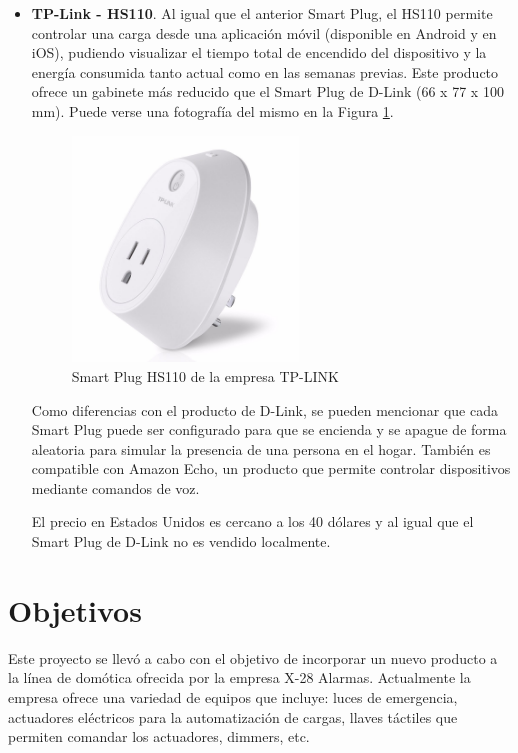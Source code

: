 \begin{itemize}
\item \textbf{TP-Link - HS110}. Al igual que el anterior Smart Plug, el HS110 permite controlar una carga desde una aplicación móvil (disponible en Android y en iOS), pudiendo visualizar el tiempo total de encendido del dispositivo y la energía consumida tanto actual como en las semanas previas. Este producto ofrece un gabinete más reducido que el Smart Plug de D-Link (66 x 77 x 100 mm). Puede verse una fotografía del mismo en la Figura \ref{fig:smartplug_tplink}.

\begin{figure}[h]
	\centering
	\includegraphics[width=6cm]{./Figures/1_2_TP-LINK-HS110.png}
	\caption{Smart Plug HS110 de la empresa TP-LINK}
	\label{fig:smartplug_tplink}
\end{figure}

Como diferencias con el producto de D-Link, se pueden mencionar que cada Smart Plug puede ser configurado para que se encienda y se apague de forma aleatoria para simular la presencia de una persona en el hogar. También es compatible con Amazon Echo, un producto que permite controlar dispositivos mediante comandos de voz.

El precio en Estados Unidos es cercano a los 40 dólares y al igual que el Smart Plug de D-Link no es vendido localmente.

\end{itemize}


\section{Objetivos}

Este proyecto se llevó a cabo con el objetivo de incorporar un nuevo producto a la línea de domótica ofrecida por la empresa X-28 Alarmas. Actualmente la empresa ofrece una variedad de equipos que incluye: luces de emergencia, actuadores eléctricos para la automatización de cargas, llaves táctiles que permiten comandar los actuadores, dimmers, etc.

